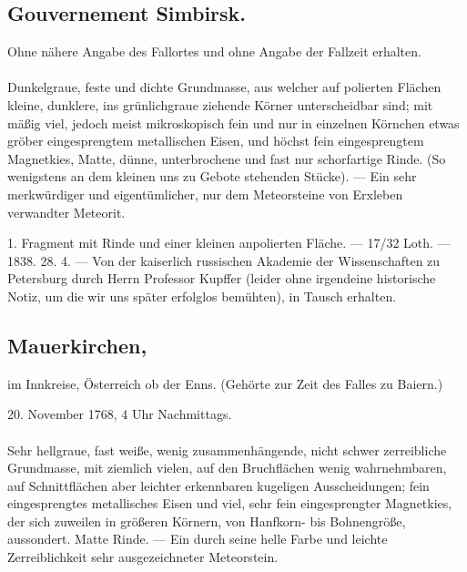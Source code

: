 \documentclass[a4paper, 11pt, oneside, polutonikogreek, german]{article}
\begin{document}
\subsection{Gouvernement Simbirsk.}
\begin{center}
\small
Ohne nähere Angabe des Fallortes und ohne Angabe der Fallzeit erhalten.
\end{center}
\paragraph{}
Dunkelgraue, feste und dichte Grundmasse, aus welcher auf polierten Flächen kleine, dunklere, ins grünlichgraue ziehende Körner unterscheidbar sind; mit mäßig viel, jedoch meist mikroskopisch fein und nur in einzelnen Körnchen etwas gröber eingesprengtem metallischen Eisen, und höchst fein eingesprengtem Magnetkies, Matte, dünne, unterbrochene und fast nur schorfartige Rinde. (So wenigstens an dem kleinen uns zu Gebote stehenden Stücke). — Ein sehr merkwürdiger und eigentümlicher, nur dem Meteorsteine von Erxleben verwandter Meteorit.

1. Fragment mit Rinde und einer kleinen anpolierten Fläche. — 17/32 Loth. — 1838. 28. 4. — Von der kaiserlich russischen Akademie der Wissenschaften zu Petersburg durch Herrn Professor Kupffer (leider ohne irgendeine historische Notiz, um die wir uns später erfolglos bemühten), in Tausch erhalten.
\subsection[Mauerkirchen.]{Mauerkirchen,}
\begin{center}
\small
im Innkreise, Österreich ob der Enns. (Gehörte zur Zeit des Falles zu Baiern.)

20. November 1768, 4 Uhr Nachmittags.
\end{center}
\paragraph{}
Sehr hellgraue, fast weiße, wenig zusammenhängende, nicht schwer zerreibliche Grundmasse, mit ziemlich vielen, auf den Bruchflächen wenig wahrnehmbaren, auf Schnittflächen aber leichter erkennbaren kugeligen Ausscheidungen; fein eingesprengtes metallisches Eisen und viel, sehr fein eingesprengter Magnetkies, der sich zuweilen in größeren Körnern, von Hanfkorn- bis Bohnengröße, aussondert. Matte Rinde. — Ein durch seine helle Farbe und leichte Zerreiblichkeit sehr ausgezeichneter Meteorstein.
\end{document}
